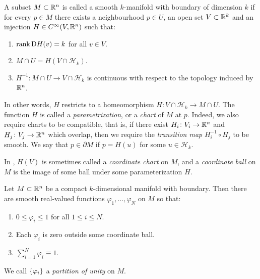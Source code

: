 \documentclass[11pt,a4paper]{article}
\begin{document}
\begin{definition}
  \label{def:smooth-manifold-with-boundary}
  A subset $M \subset \mathbb{R}^n$ is called a smooth $k$-manifold 
  with boundary of dimension $k$ if for every $p \in M$ there exists
  a neighbourhood $p \in U$, an open set $V \subset \mathbb{R}^k$ and
  an injection $H \in C^{\infty}(V, \mathbb{R}^n)$ such that:
  \begin{enumerate}
    \item[(1)] $\operatorname{rank} \mathrm{D} H(v) = k$ for all $v \in V$.
    \item[(2)] $M \cap U = H(V \cap \mathcal{H}_k)$.
    \item[(3)] $H^{-1} \colon M \cap U \to V \cap \mathcal{H}_k$
    is continuous with respect to the topology induced by $\mathbb{R}^n$.
  \end{enumerate}
  In other words, $H$ restricts to a homeomorphism
  $H \colon V \cap \mathcal H_k \to M \cap U$.
  The function $H$ is called a \textit{parametrization},
  or a \textit{chart} of $M$ at $p$.
  Indeed, we also require charts to be compatible,
  that is,
  if there exist $H_i \colon V_i \to \mathbb{R}^n$ and $H_j \colon V_j \to \mathbb{R}^n$
  which overlap, then we require the \textit{transition map}
  $H_i^{-1} \circ H_j$ to be smooth.
  We say that $p \in \partial M$ if $p = H(u)$ for some
  $u \in \mathcal H_k$.
\end{definition}
\begin{remark}
  In ,
  $H(V)$ is sometimes called a \textit{coordinate chart} on $M$,
  and a \textit{coordinate ball} on $M$ is the image of some ball
  under some parameterization $H$.
\end{remark}

\begin{theorem}
  \label{thm:partition-of-unity}
  Let $M \subset \mathbb{R}^n$ be a compact $k$-dimensional manifold with boundary.
  Then there are smooth real-valued functions
  $\varphi_1,\dots,\varphi_N$ on $M$ so that:
  \begin{enumerate}
    \item[(1)] $0 \le \varphi_i \le 1$ for all $1 \le i \le N$.
    \item[(2)] Each $\varphi_i$ is zero outside some coordinate ball.
    \item[(3)] $\sum_{i=1}^{N} \varphi_i \equiv 1$.
  \end{enumerate}
\end{theorem}
\begin{remark}
  We call $\left\{\varphi_i\right\}$ a \textit{partition of unity} on $M$.
\end{remark}
\end{document}
